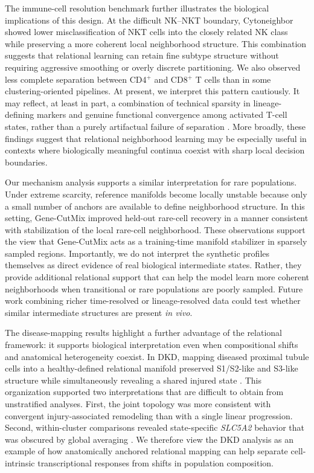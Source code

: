 \documentclass[11pt]{article}
\begin{document}
The immune-cell resolution benchmark further illustrates the biological implications of this design. At the difficult NK--NKT boundary, Cytoneighbor showed lower misclassification of NKT cells into the closely related NK class while preserving a more coherent local neighborhood structure. This combination suggests that relational learning can retain fine subtype structure without requiring aggressive smoothing or overly discrete partitioning. We also observed less complete separation between CD4$^{+}$ and CD8$^{+}$ T cells than in some clustering-oriented pipelines. At present, we interpret this pattern cautiously. It may reflect, at least in part, a combination of technical sparsity in lineage-defining markers and genuine functional convergence among activated T-cell states, rather than a purely artifactual failure of separation \cite{Juno2017CytotoxicCD4,SanchezMartinez2019CD4CTL}. More broadly, these findings suggest that relational neighborhood learning may be especially useful in contexts where biologically meaningful continua coexist with sharp local decision boundaries.

Our mechanism analysis supports a similar interpretation for rare populations. Under extreme scarcity, reference manifolds become locally unstable because only a small number of anchors are available to define neighborhood structure. In this setting, Gene-CutMix improved held-out rare-cell recovery in a manner consistent with stabilization of the local rare-cell neighborhood. These observations support the view that Gene-CutMix acts as a training-time manifold stabilizer in sparsely sampled regions. Importantly, we do not interpret the synthetic profiles themselves as direct evidence of real biological intermediate states. Rather, they provide additional relational support that can help the model learn more coherent neighborhoods when transitional or rare populations are poorly sampled. Future work combining richer time-resolved or lineage-resolved data could test whether similar intermediate structures are present \textit{in vivo}.

The disease-mapping results highlight a further advantage of the relational framework: it supports biological interpretation even when compositional shifts and anatomical heterogeneity coexist. In DKD, mapping diseased proximal tubule cells into a healthy-defined relational manifold preserved S1/S2-like and S3-like structure while simultaneously revealing a shared injured state \cite{Muto2021Kidney,Wilson2022DKD,Chen2023DKDSpatial,Lake2023KidneyAtlas}. This organization supported two interpretations that are difficult to obtain from unstratified analyses. First, the joint topology was more consistent with convergent injury-associated remodeling than with a single linear progression. Second, within-cluster comparisons revealed state-specific \textit{SLC5A2} behavior that was obscured by global averaging \cite{Wu2022SGLT2iDKD,Li2022KidneyFibrosisInjury,Gerhardt2021PTStates}. We therefore view the DKD analysis as an example of how anatomically anchored relational mapping can help separate cell-intrinsic transcriptional responses from shifts in population composition.
\end{document}
